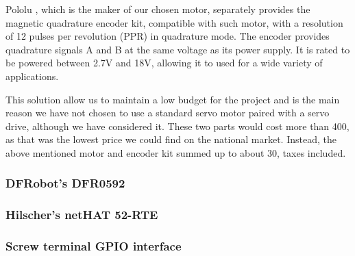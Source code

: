 Pololu \cite{brand:pololu}, which is the maker of our chosen motor, separately provides the magnetic quadrature encoder kit, compatible with such motor, with a resolution of 12 pulses per revolution (PPR) in quadrature mode.
The encoder provides quadrature signals A and B at the same voltage as its power supply.
It is rated to be powered between 2.7V and 18V, allowing it to used for a wide variety of applications.

This solution allow us to maintain a low budget for the project and is the main reason we have not chosen to use a standard servo motor paired with a servo drive, although we have considered it.
These two parts would cost more than 400\texteuro, as that was the lowest price we could find on the national market.
Instead, the above mentioned motor and encoder kit summed up to about 30\texteuro, taxes included.

\subsubsection{DFRobot's DFR0592}


\subsubsection{Hilscher's netHAT 52-RTE}


\subsubsection{Screw terminal GPIO interface}

